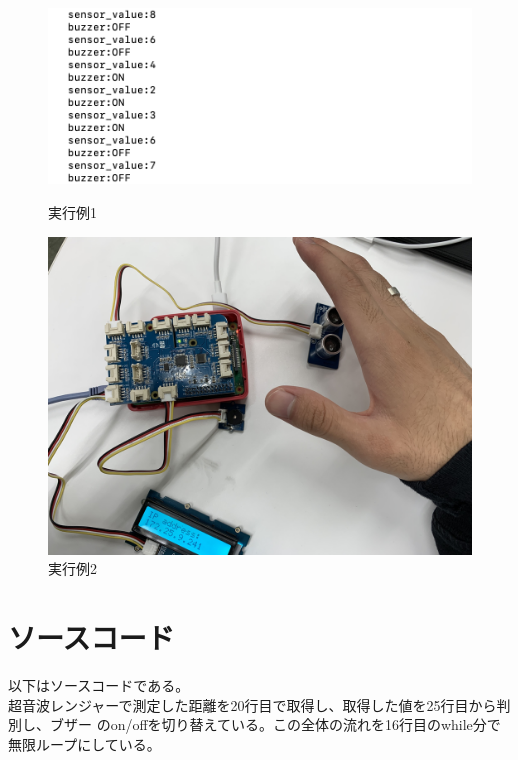 \documentclass[dvipdfmx,autodetect-engine,titlepage]{jsarticle}
\begin{document}
\begin{figure}[h]
  \centering
  \begin{minipage}[b]{0.45\linewidth}
  \begin{center}
    \includegraphics[keepaspectratio,scale=0.6]{pic4.png}
    \end{center}
    \caption{実行例1}
  \end{minipage}
  \begin{minipage}[b]{0.45\linewidth}
  \begin{center}
    \includegraphics[keepaspectratio,scale=0.04]{pic5.jpg}
    \end{center}
    \caption{実行例2}
  \end{minipage}
\end{figure}


\section{ソースコード}
以下はソースコードである。\\
超音波レンジャーで測定した距離を20行目で取得し、取得した値を25行目から判別し、ブザー
のon/offを切り替えている。この全体の流れを16行目のwhile分で無限ループにしている。
\end{document}
